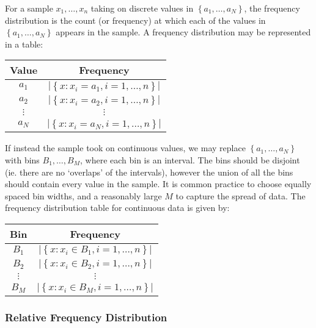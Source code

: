 \documentclass[11pt]{report} %
\begin{document}
For a sample $x_{1}, \dots, x_{n}$ taking on discrete values in $\left\{a_{1}, \dots, a_{N}\right\}$, the frequency distribution is the count (or frequency) at which each of the values in $\left\{a_{1}, \dots, a_{N}\right\}$ appears in the sample. A frequency distribution may be represented in a table:

\begin{table}[H]\centering
\begin{tabular}{|c|c|}
\hline 
Value & Frequency \\
\hline 
\hline 
$a_{1}$ & $\left|\left\{x: x_{i} = a_{1}, i = 1, \dots, n\right\}\right|$ \\
$a_{2}$ & $\left|\left\{x: x_{i} = a_{2}, i = 1, \dots, n\right\}\right|$ \\
$\vdots$ & $\vdots$ \\
$a_{N}$ & $\left|\left\{x: x_{i} = a_{N}, i = 1, \dots, n\right\}\right|$ \\
\hline
\end{tabular}
\end{table}

If instead the sample took on continuous values, we may replace $\left\{a_{1}, \dots, a_{N}\right\}$ with bins $B_{1}, \dots, B_{M}$, where each bin is an interval. The bins should be disjoint (ie. there are no `overlaps' of the intervals), however the union of all the bins should contain every value in the sample. It is common practice to choose equally spaced bin widths, and a reasonably large $M$ to capture the spread of data. The frequency distribution table for continuous data is given by:

\begin{table}[H]\centering
\begin{tabular}{|c|c|}
\hline 
Bin & Frequency \\
\hline 
\hline 
$B_{1}$ & $\left|\left\{x: x_{i} \in B_{1}, i = 1, \dots, n\right\}\right|$ \\
$B_{2}$ & $\left|\left\{x: x_{i} \in B_{2}, i = 1, \dots, n\right\}\right|$ \\
$\vdots$ & $\vdots$ \\
$B_{M}$ & $\left|\left\{x: x_{i} \in B_{M}, i = 1, \dots, n\right\}\right|$ \\
\hline
\end{tabular}
\end{table}

\subsubsection{Relative Frequency Distribution}
\end{document}
